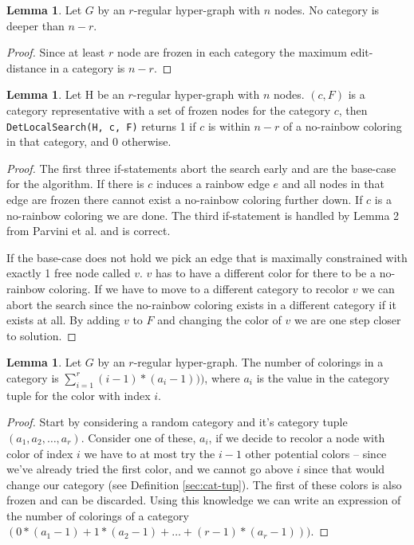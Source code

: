 \documentclass{book}
\theoremstyle{definition}
\newtheorem{lemma}[theorem]{Lemma}
\begin{document}
\begin{lemma}
  Let $G$ by an $r$-regular hyper-graph with $n$ nodes. No category is deeper than $n - r$.
\end{lemma}
\begin{proof}
  Since at least $r$ node are frozen in each category the maximum edit-distance in a category is $n - r$.
\end{proof}

\begin{lemma}
  Let H be an $r$-regular hyper-graph with $n$ nodes. $(c, F)$ is a category representative with a set of frozen nodes for the category $c$, then \texttt{DetLocalSearch(H, c, F)} returns 1 if $c$ is within $n - r$ of a no-rainbow coloring in that category, and 0 otherwise.
\end{lemma}
\begin{proof}
  The first three if-statements abort the search early and are the base-case for the algorithm. If there is $c$ induces a rainbow edge $e$ and all nodes in that edge are frozen there cannot exist a no-rainbow coloring further down. If $c$ is a no-rainbow coloring we are done. The third if-statement is handled by Lemma 2 from Parvini et al. and is correct.

  If the base-case does not hold we pick an edge that is maximally constrained with exactly 1 free node called $v$. $v$ has to have a different color for there to be a no-rainbow coloring. If we have to move to a different category to recolor $v$ we can abort the search since the no-rainbow coloring exists in a different category if it exists at all. By adding $v$ to $F$ and  changing the color of $v$ we are one step closer to solution.
\end{proof}

\begin{lemma} \label{lemma:fazter}
  Let $G$ by an $r$-regular hyper-graph. The number of colorings in a category is $\sum^r_{i=1} (i - 1) * (a_i - 1)))$, where $a_i$ is the value in the category tuple for the color with index $i$.
\end{lemma}
\begin{proof}
  Start by considering a random category and it's category tuple $(a_1, a_2, \dots, a_r)$. Consider one of these, $a_i$, if we decide to recolor a node with color of index $i$ we have to at most try the $i - 1$ other potential colors -- since we've already tried the first color, and we cannot go above $i$ since that would change our category (see Definition \ref{sec:cat-tup}). The first of these colors is also frozen and can be discarded. Using this knowledge we can write an expression of the number of colorings of a category $(0 * (a_1 - 1) + 1 * (a_2 - 1) + \dots + (r - 1) * (a_r - 1)))$.
\end{proof}
\end{document}
